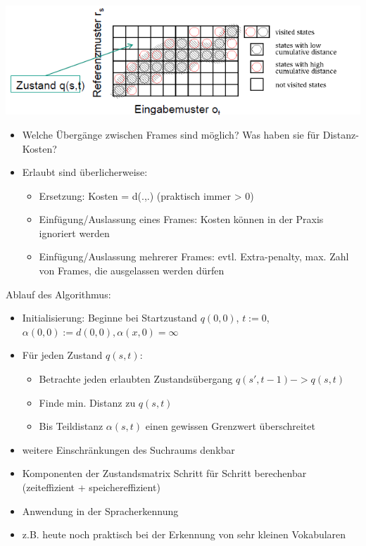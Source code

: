 \documentclass[a4paper,10pt,oneside]{article}
\begin{document}
 		\centering
 		\includegraphics[scale=0.65]{Grafiken/DTW_Beispiel.png}
 		
 		\begin{itemize}
 			\item Welche Übergänge zwischen Frames sind möglich? Was haben sie für Distanz-Kosten?
 			\item Erlaubt sind überlicherweise:
 				\begin{itemize}
 					\item Ersetzung: Kosten = d(.,.) (praktisch immer > 0)
 					\item Einfügung/Auslassung eines Frames: Kosten können in der Praxis ignoriert werden
 					\item Einfügung/Auslassung mehrerer Frames: evtl. Extra-penalty, max. Zahl von Frames, die ausgelassen werden dürfen
 				\end{itemize}
 		\end{itemize}
\vspace{5px}
\flushleft Ablauf des Algorithmus:
 			\begin{itemize}
 				\item Initialisierung: Beginne bei Startzustand $q(0,0)$, $t:=0$, $\alpha(0,0):=d(0,0), \alpha(x,0)=\infty$
 				\item Für jeden Zustand $q(s,t)$:
 					\begin{itemize}
 						\item Betrachte jeden erlaubten Zustandsübergang $q(s',t-1) -> q(s,t)$
 						\item Finde min. Distanz zu $q(s,t)$
 						\item Bis Teildistanz $\alpha(s,t)$ einen gewissen Grenzwert überschreitet
 					\end{itemize}
 				\item weitere Einschränkungen des Suchraums denkbar
 				\item Komponenten der Zustandsmatrix Schritt für Schritt berechenbar (zeiteffizient + speichereffizient)
 			\end{itemize}
 		\begin{itemize}
 			\item Anwendung in der Spracherkennung
 			\item z.B. heute noch praktisch bei der Erkennung von sehr kleinen Vokabularen
		\end{itemize} 	
		
\end{document}
